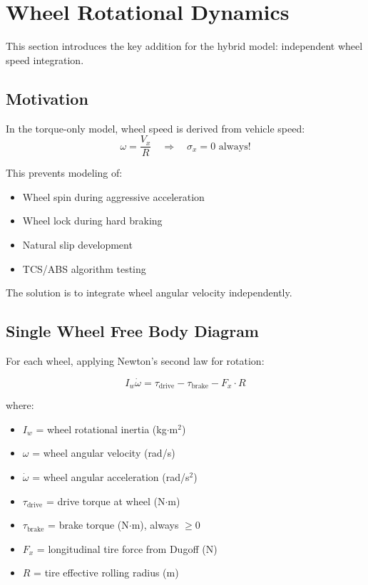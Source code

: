 \documentclass[11pt,a4paper]{article}
\begin{document}
\section{Wheel Rotational Dynamics}
\label{sec:wheel_dynamics}

This section introduces the key addition for the hybrid model: independent wheel speed integration.

\subsection{Motivation}

In the torque-only model, wheel speed is derived from vehicle speed:
\begin{equation}
\omega = \frac{V_x}{R} \quad \Rightarrow \quad \sigma_x = 0 \text{ always!}
\end{equation}

This prevents modeling of:
\begin{itemize}
    \item Wheel spin during aggressive acceleration
    \item Wheel lock during hard braking
    \item Natural slip development
    \item TCS/ABS algorithm testing
\end{itemize}

The solution is to integrate wheel angular velocity independently.

\subsection{Single Wheel Free Body Diagram}

For each wheel, applying Newton's second law for rotation:

\begin{equation}
\boxed{I_w \dot{\omega} = \tau_{\text{drive}} - \tau_{\text{brake}} - F_x \cdot R}
\label{eq:wheel_dynamics}
\end{equation}

where:
\begin{itemize}
    \item $I_w$ = wheel rotational inertia (kg$\cdot$m$^2$)
    \item $\omega$ = wheel angular velocity (rad/s)
    \item $\dot{\omega}$ = wheel angular acceleration (rad/s$^2$)
    \item $\tau_{\text{drive}}$ = drive torque at wheel (N$\cdot$m)
    \item $\tau_{\text{brake}}$ = brake torque (N$\cdot$m), always $\geq 0$
    \item $F_x$ = longitudinal tire force from Dugoff (N)
    \item $R$ = tire effective rolling radius (m)
\end{itemize}
\end{document}

